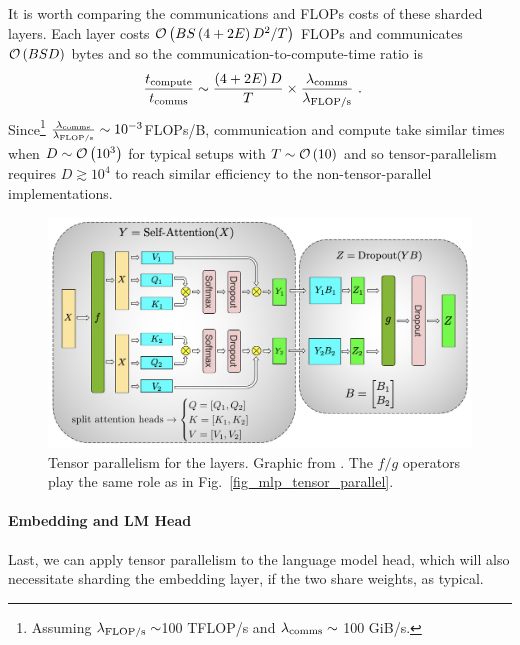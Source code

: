It is worth comparing the communications and FLOPs costs of these sharded layers. Each layer costs
$ \mathcal{O} \left(    BS \left ( 4+2E \right )  D ^{ 2 }/T \right)$ FLOPs and communicates
$ \mathcal{O} \left( BSD \right)  $ bytes and so the communication-to-compute-time ratio is
\begin{align}
  \frac{ t _{ {\rm  compute} } }{ t _{ {\rm  comms} } } & \sim  \frac{ \left ( 4+2E \right) D }{ T }\times \frac{ \lambda _{ {\rm comms} }  }{ \lambda _{ {\rm FLOP/s} }} \ .
\end{align}
Since\footnote{Assuming $ \lambda _{\rm  FLOP/s }\sim  $100 TFLOP/s and $ \lambda _{ {\rm comms} }
\sim $ 100 GiB/s.} $ \frac{ \lambda _{ {\rm comms} }  }{ \lambda _{ {\rm FLOP/s} }} \sim 10 ^{ -3 }
$FLOPs/B, communication and compute take similar times when  $ D \sim \mathcal{O} \left( 10 ^{ 3 } \right)
$ for typical setups with $ T \sim \mathcal{O} \left( 10 \right)  $ and so tensor-parallelism requires
$ D \gtrsim 10 ^{ 4 } $ to reach similar efficiency to the non-tensor-parallel implementations.


\begin{figure}[ht]
	\centering
	\includegraphics[scale=.45]{figures/attention_mp_2.png}
	\caption{Tensor parallelism for the  layers. Graphic from
		\cite{shoeybi2020megatronlm}. The $ f/g $ operators play the same role as in
		Fig.~\ref{fig_mlp_tensor_parallel}.}
	\label{fig_attn_tensor_parallel}
\end{figure}

\paragraph{Embedding and LM Head} Last, we can apply tensor parallelism to the language model head,
which will also necessitate sharding the embedding layer, if the two share weights, as typical.

